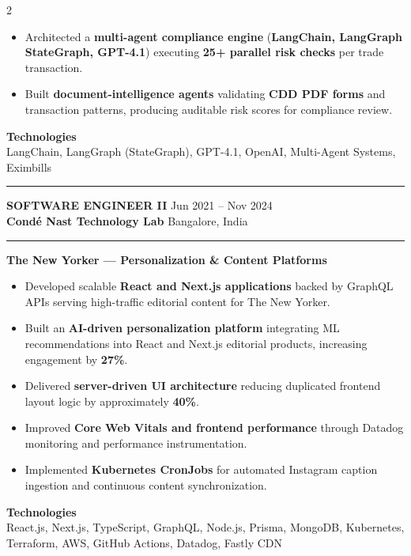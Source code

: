 \documentclass[10pt,a4paper]{article}
\newcommand{\blockdivider}{\vspace{0pt}\color{rulecolor}\rule{\linewidth}{0.5pt}\color{primary}\vspace{4pt}}
\newcommand{\roleheader}[4]{%
  \noindent
  \textbf{\MakeUppercase{#3}}%
  \hfill
  \textcolor{secondary}{#4}\\[0pt]

  \noindent
  \textbf{#1}%
  \hfill
  \textcolor{secondary}{#2}\\[0pt]
}
\newcommand{\roledivider}{%
  \vspace{-1pt}%
  {\color{rulecolor}\rule{\linewidth}{0.5pt}}%
  \vspace{2pt}%
}
\newcommand{\projecttitle}[1]{\textbf{#1}\par\vspace{2pt}}
\begin{document}
\begin{paracol}{2}
\begin{itemize}

\item Architected a \textbf{multi-agent compliance engine} (\textbf{LangChain, LangGraph StateGraph, GPT-4.1}) executing \textbf{25+ parallel risk checks} per trade transaction.

\item Built \textbf{document-intelligence agents} validating \textbf{CDD PDF forms} and transaction patterns, producing auditable risk scores for compliance review.

\end{itemize}

\textbf{Technologies}\\
LangChain, LangGraph (StateGraph), GPT-4.1, OpenAI, Multi-Agent Systems, Eximbills

\blockdivider


\roleheader{Cond\'e Nast Technology Lab}{Bangalore, India}{Software Engineer II}{Jun 2021 -- Nov 2024}
\roledivider
\projecttitle{ The New Yorker — Personalization \& Content Platforms}

\begin{itemize}

\item Developed scalable \textbf{React and Next.js applications} backed by GraphQL APIs serving high-traffic editorial content for The New Yorker.

\item Built an \textbf{AI-driven personalization platform} integrating ML recommendations into React and Next.js editorial products, increasing engagement by \textbf{27\%}.

\item Delivered \textbf{server-driven UI architecture} reducing duplicated frontend layout logic by approximately \textbf{40\%}.

\item Improved \textbf{Core Web Vitals and frontend performance} through Datadog monitoring and performance instrumentation.

\item Implemented \textbf{Kubernetes CronJobs} for automated Instagram caption ingestion and continuous content synchronization.

\end{itemize}

\textbf{Technologies}\\
React.js, Next.js, TypeScript, GraphQL, Node.js, Prisma, MongoDB, Kubernetes, Terraform, AWS, GitHub Actions, Datadog, Fastly CDN


\end{paracol}
\end{document}
